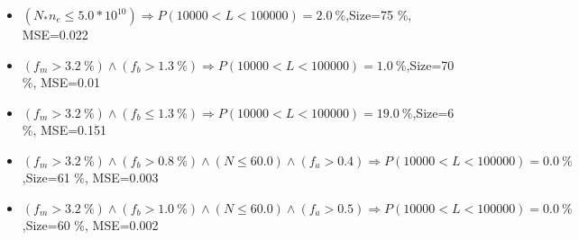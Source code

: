 \documentclass[numbered]{CSL}
\begin{document}
\begin{itemize}
\item $(N_* n_e \leq 5.0 * 10^{10}) \Rightarrow P(10 000 < L < 100 000) = 2.0~\%$,\hfill Size=75 \%, MSE=0.022
\item $(f_m > 3.2~\%) \land (f_b > 1.3~\%) \Rightarrow P(10 000 < L < 100 000) = 1.0~\%$,\hfill Size=70 \%, MSE=0.01
\item $(f_m > 3.2~\%) \land (f_b \leq 1.3~\%) \Rightarrow P(10 000 < L < 100 000) = 19.0~\%$,\hfill Size=6 \%, MSE=0.151
\item $(f_m > 3.2~\%) \land (f_b > 0.8~\%) \land (N \leq 60.0) \land (f_a > 0.4) \Rightarrow P(10 000 < L < 100 000) = 0.0~\%$,\hfill Size=61 \%, MSE=0.003
\item $(f_m > 3.2~\%) \land (f_b > 1.0~\%) \land (N \leq 60.0) \land (f_a > 0.5) \Rightarrow P(10 000 < L < 100 000) = 0.0~\%$,\hfill Size=60 \%, MSE=0.002
\end{itemize}
\end{document}

